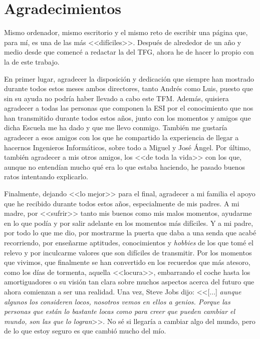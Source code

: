 \chapter{Agradecimientos}

Mismo ordenador, mismo escritorio y el mismo reto de escribir una página que, para mí, es una de las más <<difíciles>>. Después de alrededor de un año y medio desde que comencé a redactar la del \acs{TFG}, ahora he de hacer lo propio con la de este trabajo.

En primer lugar, agradecer la disposición y dedicación que siempre han mostrado durante todos estos meses ambos directores, tanto Andrés como Luis, puesto que sin su ayuda no podría haber llevado a cabo este \acs{TFM}. Además, quisiera agradecer a todas las personas que componen la \acs{ESI} por el conocimiento que nos han transmitido durante todos estos años, junto con los momentos y amigos que dicha Escuela me ha dado y que me llevo conmigo. También me gustaría agradecer a esos amigos con los que he compartido la experiencia de llegar a hacernos Ingenieros Informáticos, sobre todo a Miguel y José Ángel. Por último, también agradecer a mis otros amigos, los <<de toda la vida>> con los que, aunque no entendían mucho qué era lo que estaba haciendo, he pasado buenos ratos intentando explicarlo.

Finalmente, dejando <<lo mejor>> para el final, agradecer a mi familia el apoyo que he recibido durante todos estos años, especialmente de mis padres. A mi madre, por <<sufrir>> tanto mis buenos como mis malos momentos, ayudarme en lo que podía y por salir adelante en los momentos más difíciles. Y a mi padre, por todo lo que me dio, por mostrarme la puerta que daba a una senda que acabé recorriendo, por enseñarme aptitudes, conocimientos y \textit{hobbies} de los que tomé el relevo y por inculcarme valores que son difíciles de transmitir. Por los momentos que vivimos, que finalmente se han convertido en los recuerdos que más atesoro, como los días de tormenta, aquella <<locura>>, embarrando el coche hasta los amortiguadores o su visión tan clara sobre muchos aspectos acerca del futuro que ahora comienzan a ser una realidad. Una vez, Steve Jobs dijo: <<[...] \textit{aunque algunos los consideren locos, nosotros vemos en ellos a genios. Porque las personas que están lo bastante locas como para creer que pueden cambiar el mundo, son las que lo logran}>>. No sé si llegaría a cambiar algo del mundo, pero de lo que estoy seguro es que cambió mucho del mío.


